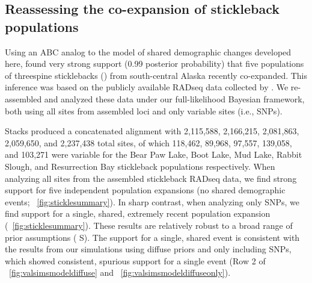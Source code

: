 % 




\subsection{Reassessing the co-expansion of stickleback populations}

Using an ABC analog to the model of shared demographic changes developed here,
\citet{Xue2015} found very strong support (0.99 posterior probability) that
five populations of threespine sticklebacks ()
from south-central Alaska recently
co-expanded.
This inference was based on the publicly available RADseq data collected by
\citet{Hohenlohe2010}.
We re-assembled and analyzed these data under our full-likelihood
Bayesian framework, both using all sites from assembled loci
and only variable sites (i.e., SNPs).


Stacks produced a concatenated alignment with
2,115,588,
2,166,215,
2,081,863,
2,059,650, and
2,237,438
total sites, of which
118,462,
89,968,
97,557,
139,058, and
103,271
were variable for the Bear Paw Lake, Boot Lake, Mud Lake, Rabbit Slough, and
Resurrection Bay stickleback populations respectively.
When analyzing all sites from the assembled stickleback
RADseq data, we find strong support for five independent
population expansions (no shared demographic events;
\fig{}~\ref{fig:sticklesummary}).
In sharp contrast, when analyzing only SNPs, we find
support for a single, shared, extremely recent population expansion
(\fig{}~\ref{fig:sticklesummary}).
These results are relatively robust to a broad range of prior
assumptions
(\figs
S).
The support for a single, shared event is consistent with the results from our
simulations using diffuse priors and only including SNPs, which showed
consistent, spurious support for a single event
(Row 2 of \fig{}~\ref{fig:valsimsmodeldiffuse}
and \fig{}~\ref{fig:valsimsmodeldiffuseonly}).

